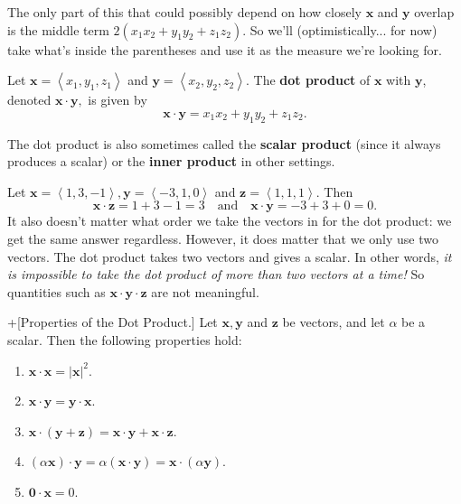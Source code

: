 \documentclass[10pt,]{book}
\newcommand{\terminology}[1]{\textbf{#1}}
\theoremstyle{ptxplainnotitle}
\theoremstyle{ptxplaintitle}
\theoremstyle{ptxplainnotitle}
\theoremstyle{ptxplaintitle}
\theoremstyle{ptxplainnotitle}
\theoremstyle{ptxplaintitle}
\theoremstyle{ptxdefinitionnotitle}
\theoremstyle{ptxdefinitiontitle}
\theoremstyle{ptxdefinitionnotitle}
\theoremstyle{ptxdefinitiontitle}
\theoremstyle{ptxdefinitionnotitle}
\theoremstyle{ptxdefinitiontitle}
\theoremstyle{ptxdefinitionnotitle}
\theoremstyle{ptxdefinitiontitle}
\theoremstyle{ptxdefinitionnotitle}
\theoremstyle{ptxdefinitiontitle}
\numberwithin{equation}{section}
\newcommand{\vv}[1]{\mathbf{#1}}
\newcommand{\dotprod}[1]{\left\langle #1 \right\rangle}
\begin{document}
\hypertarget{p-785}{}%
The only part of this that could possibly depend on how closely \(\vv{x}\) and \(\vv{y}\) overlap is the middle term \(2(x_{1}x_{2}+y_{1}y_{2}+z_{1}z_{2})\). So we'll (optimistically... for now) take what's inside the parentheses and use it as the measure we're looking for.%
\begin{definition}\label{definition-the-dot-product}
\hypertarget{p-786}{}%
Let \(\vv{x} = \dotprod{x_{1},y_{1},z_{1}}\) and \(\vv{y} = \dotprod{x_{2},y_{2},z_{2}}\). The \terminology{dot product} of \(\vv{x}\) with \(\vv{y}\), denoted \(\vv{x}\cdot\vv{y},\) is given by%
%
\begin{equation*}
\vv{x}\cdot\vv{y} = x_{1}x_{2}+y_{1}y_{2}+z_{1}z_{2}.
\end{equation*}
\end{definition}
\hypertarget{p-787}{}%
The dot product is also sometimes called the \terminology{scalar product} (since it always produces a scalar) or the \terminology{inner product} in other settings.%
\begin{example}\label{example-computing-dot-products}
\hypertarget{p-788}{}%
Let \(\vv{x} = \dotprod{1,3,-1},\vv{y} = \dotprod{-3,1,0}\) and \(\vv{z} = \dotprod{1,1,1}\). Then%
%
\begin{equation*}
\vv{x}\cdot\vv{z} = 1+3-1 = 3\quad\text{and}\quad\vv{x}\cdot\vv{y} = -3+3+0 = 0.
\end{equation*}
\hypertarget{p-789}{}%
It also doesn't matter what order we take the vectors in for the dot product: we get the same answer regardless. However, it does matter that we only use two vectors. The dot product takes two vectors and gives a scalar. In other words, \emph{it is impossible to take the dot product of more than two vectors at a time!} So quantities such as \(\vv{x}\cdot\vv{y}\cdot\vv{z}\) are not meaningful.%
\end{example}
\begin{theorem}+[{Properties of the Dot Product.}]\label{theorem-properties-of-the-dot-product}
\hypertarget{p-790}{}%
Let \(\vv{x},\vv{y}\) and \(\vv{z}\) be vectors, and let \(\alpha\) be a scalar. Then the following properties hold:%
\leavevmode%
\begin{multicols}{2}
\begin{enumerate}
\item\hypertarget{li-60}{}\hypertarget{p-791}{}%
\(\vv{x}\cdot\vv{x} = |\vv{x}|^{2}.\)%
\item\hypertarget{li-61}{}\hypertarget{p-792}{}%
\(\vv{x}\cdot\vv{y} = \vv{y}\cdot\vv{x}.\)%
\item\hypertarget{li-62}{}\hypertarget{p-793}{}%
\(\vv{x}\cdot(\vv{y}+\vv{z}) = \vv{x}\cdot\vv{y}+\vv{x}\cdot\vv{z}.\)%
\item\hypertarget{li-63}{}\hypertarget{p-794}{}%
\((\alpha\vv{x})\cdot\vv{y} = \alpha(\vv{x}\cdot\vv{y}) = \vv{x}\cdot(\alpha\vv{y}).\)%
\item\hypertarget{li-64}{}\hypertarget{p-795}{}%
\(\vv{0}\cdot\vv{x} = 0.\)%
\end{enumerate}
\end{multicols}
\end{theorem}
\end{document}
